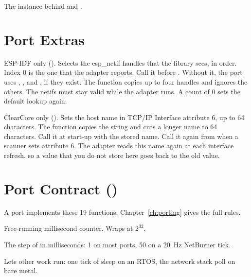\ret The instance behind  and .

\section{Port Extras}

ESP-IDF only (). Selects the esp\_netif
handles that the library sees, in order. Index 0 is the one that the adapter
reports. Call it before . Without it, the port uses
, , and , if they exist.
The function copies up to four handles and ignores the others. The netifs
must stay valid while the adapter runs. A count of 0 sets the default lookup
again.

ClearCore only (). Sets the host name
in TCP/IP Interface attribute 6, up to 64 characters. The function copies the
string and cuts a longer name to 64 characters. Call it at start-up with the
stored name. Call it again from  when a scanner sets
attribute 6. The adapter reads this name again at each interface refresh, so
a value that you do not store here goes back to the old value.

\section{Port Contract ()}

A port implements these 19 functions. Chapter~\ref{ch:porting} gives the
full rules.

Free-running millisecond counter. Wraps at $2^{32}$.

The step of  in milliseconds: 1 on most ports, 50 on a
20~Hz NetBurner tick.

Lets other work run: one tick of sleep on an RTOS, the network stack poll on
bare metal.

